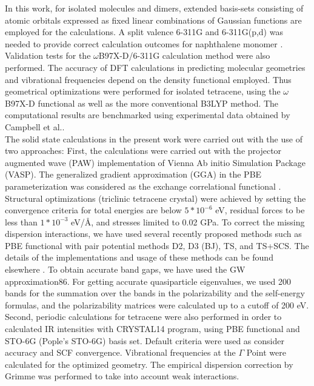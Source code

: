 In this work, for isolated molecules and dimers, extended basis-sets consisting of atomic orbitals expressed as fixed linear combinations of Gaussian functions are employed for the calculations.  A split valence 6-311G and 6-311G(p,d) \cite{krishnan1980self,frisch1984self} was needed to provide correct calculation outcomes for naphthalene monomer \cite{saeki2006theoretical}. Validation tests for the $\omega$B97X-D/6-311G calculation method were also performed. The accuracy of DFT calculations in predicting molecular geometries and vibrational frequencies depend on the density functional employed. Thus geometrical optimizations were performed for isolated tetracene, using the $\omega$B97X-D functional as well as the more conventional B3LYP method. The computational results are benchmarked using experimental data obtained by Campbell et al.\cite{campbell1962crystal}.\\
 
 The solid state calculations in the present work were carried out with the use of two approaches:
First, the calculations were carried out with the projector augmented wave (PAW) implementation of Vienna Ab initio Simulation Package (VASP)\cite{kresse1996efficient}. The generalized gradient approximation (GGA) in the PBE parameterization was considered as the exchange correlational functional \cite{perdew1996generalized}. Structural optimizations (triclinic tetracene crystal) were achieved by setting the convergence criteria for total energies are below $5*10^{-6}$ eV, residual forces to be less than $1*10^{-3}$ eV/Å, and stresses limited to 0.02 GPa. To correct the missing dispersion interactions, we have used several recently proposed methods such as PBE functional with pair potential methods D2, D3 (BJ), TS, and TS+SCS. The details of the implementations and usage of these methods can be found elsewhere \cite{grimme2006semiempirical,grimme2011effect,tkatchenko2009accurate,tkatchenko2012accurate,dion2004van}. To obtain accurate band gaps, we have used the GW approximation86.  For getting accurate quasiparticle eigenvalues, we used 200 bands for the summation over the bands in the polarizability and the self-energy formulas, and the polarizability matrices were calculated up to a cutoff  of 200 eV.\\ 
Second, periodic calculations for tetracene were also performed in order to calculated IR intensities with CRYSTAL14 program\cite{dovesi2014crystal14}, using PBE functional and STO-6G (Pople's STO-6G) basis set. Default criteria were used as consider accuracy and SCF convergence. Vibrational frequencies at the $\Gamma$ Point were calculated for the optimized geometry. The empirical dispersion correction by Grimme \cite{grimme2006semiempirical} was performed to take into account weak interactions. 

